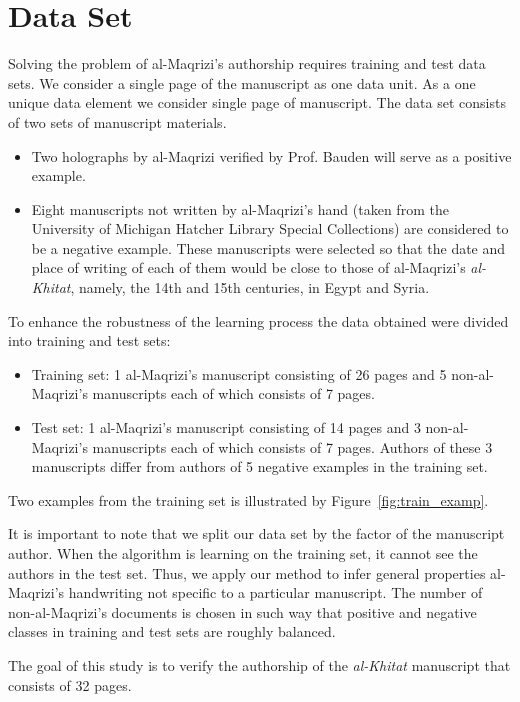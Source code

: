 \documentclass[conference]{IEEEtran}
\begin{document}
\section{Data Set}
\label{sec:the_data}

Solving the problem of al-Maqrizi's authorship requires training and test data sets. 
We consider a single page of the manuscript as one data unit.
As a one unique data element we consider single page of manuscript. The data set consists of two sets of manuscript materials.
\begin{itemize}
	\item Two holographs by al-Maqrizi verified by Prof. Bauden will serve as a positive example.
	\item Eight manuscripts not written by al-Maqrizi's hand  (taken from the University of Michigan Hatcher Library Special Collections) are considered to be a negative example. These manuscripts were selected so that the date and place of writing of each of them would be close to those of al-Maqrizi's  \textit{al-Khitat}, namely, the 14th and 15th centuries, in Egypt and Syria.
\end{itemize}

To enhance the robustness of the learning process the data obtained were divided into training and test sets:
\begin{itemize}
	\item Training set: 1 al-Maqrizi's manuscript consisting of 26 pages and 5 non-al-Maqrizi's manuscripts each of which consists of 7 pages.
	\item Test set: 1 al-Maqrizi's manuscript consisting of 14 pages and 3 non-al-Maqrizi's manuscripts each of which consists of 7 pages. Authors of these 3 manuscripts differ from authors of 5 negative examples in the training set.   
\end{itemize}

Two examples from the training set is illustrated by Figure~\ref{fig:train_examp}. 

It is important to note that we split our data set by the factor of the manuscript author. When the algorithm is learning on the training set, it cannot see the authors in the test set. Thus, we apply our method to infer general properties al-Maqrizi's handwriting not specific to a particular manuscript. The number of non-al-Maqrizi's documents is chosen in such way that positive and negative classes in training and test sets are roughly balanced.

The goal of this study is to verify the authorship of the \textit{al-Khitat} manuscript that consists of 32 pages.
\end{document}
